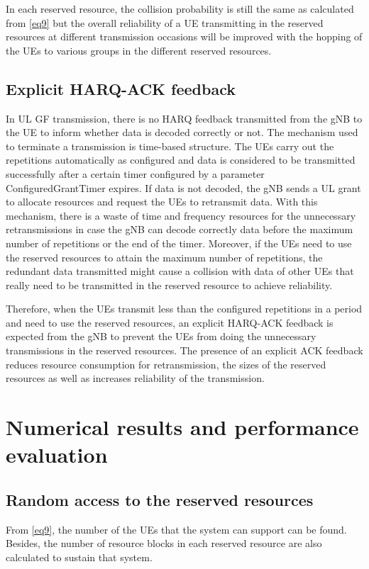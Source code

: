 \documentclass[conference]{IEEEtran}
\begin{document}
In each reserved resource, the collision probability is still the same as calculated from \eqref{eq9} but the overall reliability of a UE transmitting in the reserved resources at different transmission occasions will be improved with the hopping of the UEs to various groups in the different reserved resources.

\subsection{Explicit HARQ-ACK feedback}\label{IIFF}
In UL GF transmission, there is no HARQ feedback transmitted from the gNB to the UE to inform whether data is decoded correctly or not. The mechanism used to terminate a transmission is time-based structure. The UEs carry out the repetitions automatically as configured and data is considered to be transmitted successfully after a certain timer configured by a parameter ConfiguredGrantTimer expires. If data is not decoded, the gNB sends a UL grant to allocate resources and request the UEs to retransmit data. With this mechanism, there is a waste of time and frequency resources for the unnecessary retransmissions in case the gNB can decode correctly data before the maximum number of repetitions or the end of the timer. Moreover, if the UEs need to use the reserved resources to attain the maximum number of repetitions, the redundant data transmitted might cause a collision with data of other UEs that really need to be transmitted in the reserved resource to achieve reliability.

Therefore, when the UEs transmit less than the configured repetitions in a period and need to use the reserved resources, an explicit HARQ-ACK feedback is expected from the gNB to prevent the UEs from doing the unnecessary transmissions in the reserved resources. The presence of an explicit ACK feedback reduces resource consumption for retransmission, the sizes of the reserved resources as well as increases reliability of the transmission.

\section{Numerical results and performance evaluation}\label{III}

\subsection{Random access to the reserved resources}\label{IIIAA}
From \eqref{eq9}, the number of the UEs that the system can support can be found. Besides, the number of resource blocks in each reserved resource are also calculated to sustain that system.
\end{document}
